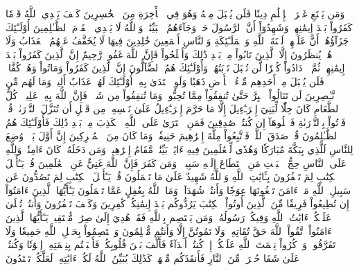 وَمَن يَبۡتَغِ غَيۡرَ ٱلۡإِسۡلَٰمِ دِينٗا فَلَن يُقۡبَلَ مِنۡهُ وَهُوَ فِي ٱلۡأٓخِرَةِ مِنَ ٱلۡخَٰسِرِينَ
كَيۡفَ يَهۡدِي ٱللَّهُ قَوۡمٗا كَفَرُواْ بَعۡدَ إِيمَٰنِهِمۡ وَشَهِدُوٓاْ أَنَّ ٱلرَّسُولَ حَقّٞ وَجَآءَهُمُ ٱلۡبَيِّنَٰتُۚ وَٱللَّهُ لَا يَهۡدِي ٱلۡقَوۡمَ ٱلظَّـٰلِمِينَ
أُوْلَـٰٓئِكَ جَزَآؤُهُمۡ أَنَّ عَلَيۡهِمۡ لَعۡنَةَ ٱللَّهِ وَٱلۡمَلَـٰٓئِكَةِ وَٱلنَّاسِ أَجۡمَعِينَ
خَٰلِدِينَ فِيهَا لَا يُخَفَّفُ عَنۡهُمُ ٱلۡعَذَابُ وَلَا هُمۡ يُنظَرُونَ
إِلَّا ٱلَّذِينَ تَابُواْ مِنۢ بَعۡدِ ذَٰلِكَ وَأَصۡلَحُواْ فَإِنَّ ٱللَّهَ غَفُورٞ رَّحِيمٌ
إِنَّ ٱلَّذِينَ كَفَرُواْ بَعۡدَ إِيمَٰنِهِمۡ ثُمَّ ٱزۡدَادُواْ كُفۡرٗا لَّن تُقۡبَلَ تَوۡبَتُهُمۡ وَأُوْلَـٰٓئِكَ هُمُ ٱلضَّآلُّونَ
إِنَّ ٱلَّذِينَ كَفَرُواْ وَمَاتُواْ وَهُمۡ كُفَّارٞ فَلَن يُقۡبَلَ مِنۡ أَحَدِهِم مِّلۡءُ ٱلۡأَرۡضِ ذَهَبٗا وَلَوِ ٱفۡتَدَىٰ بِهِۦٓۗ أُوْلَـٰٓئِكَ لَهُمۡ عَذَابٌ أَلِيمٞ وَمَا لَهُم مِّن نَّـٰصِرِينَ
لَن تَنَالُواْ ٱلۡبِرَّ حَتَّىٰ تُنفِقُواْ مِمَّا تُحِبُّونَۚ وَمَا تُنفِقُواْ مِن شَيۡءٖ فَإِنَّ ٱللَّهَ بِهِۦ عَلِيمٞ
۞كُلُّ ٱلطَّعَامِ كَانَ حِلّٗا لِّبَنِيٓ إِسۡرَـٰٓءِيلَ إِلَّا مَا حَرَّمَ إِسۡرَـٰٓءِيلُ عَلَىٰ نَفۡسِهِۦ مِن قَبۡلِ أَن تُنَزَّلَ ٱلتَّوۡرَىٰةُۚ قُلۡ فَأۡتُواْ بِٱلتَّوۡرَىٰةِ فَٱتۡلُوهَآ إِن كُنتُمۡ صَٰدِقِينَ
فَمَنِ ٱفۡتَرَىٰ عَلَى ٱللَّهِ ٱلۡكَذِبَ مِنۢ بَعۡدِ ذَٰلِكَ فَأُوْلَـٰٓئِكَ هُمُ ٱلظَّـٰلِمُونَ
قُلۡ صَدَقَ ٱللَّهُۗ فَٱتَّبِعُواْ مِلَّةَ إِبۡرَٰهِيمَ حَنِيفٗاۖ وَمَا كَانَ مِنَ ٱلۡمُشۡرِكِينَ
إِنَّ أَوَّلَ بَيۡتٖ وُضِعَ لِلنَّاسِ لَلَّذِي بِبَكَّةَ مُبَارَكٗا وَهُدٗى لِّلۡعَٰلَمِينَ
فِيهِ ءَايَٰتُۢ بَيِّنَٰتٞ مَّقَامُ إِبۡرَٰهِيمَۖ وَمَن دَخَلَهُۥ كَانَ ءَامِنٗاۗ وَلِلَّهِ عَلَى ٱلنَّاسِ حِجُّ ٱلۡبَيۡتِ مَنِ ٱسۡتَطَاعَ إِلَيۡهِ سَبِيلٗاۚ وَمَن كَفَرَ فَإِنَّ ٱللَّهَ غَنِيٌّ عَنِ ٱلۡعَٰلَمِينَ
قُلۡ يَـٰٓأَهۡلَ ٱلۡكِتَٰبِ لِمَ تَكۡفُرُونَ بِـَٔايَٰتِ ٱللَّهِ وَٱللَّهُ شَهِيدٌ عَلَىٰ مَا تَعۡمَلُونَ
قُلۡ يَـٰٓأَهۡلَ ٱلۡكِتَٰبِ لِمَ تَصُدُّونَ عَن سَبِيلِ ٱللَّهِ مَنۡ ءَامَنَ تَبۡغُونَهَا عِوَجٗا وَأَنتُمۡ شُهَدَآءُۗ وَمَا ٱللَّهُ بِغَٰفِلٍ عَمَّا تَعۡمَلُونَ
يَـٰٓأَيُّهَا ٱلَّذِينَ ءَامَنُوٓاْ إِن تُطِيعُواْ فَرِيقٗا مِّنَ ٱلَّذِينَ أُوتُواْ ٱلۡكِتَٰبَ يَرُدُّوكُم بَعۡدَ إِيمَٰنِكُمۡ كَٰفِرِينَ
وَكَيۡفَ تَكۡفُرُونَ وَأَنتُمۡ تُتۡلَىٰ عَلَيۡكُمۡ ءَايَٰتُ ٱللَّهِ وَفِيكُمۡ رَسُولُهُۥۗ وَمَن يَعۡتَصِم بِٱللَّهِ فَقَدۡ هُدِيَ إِلَىٰ صِرَٰطٖ مُّسۡتَقِيمٖ
يَـٰٓأَيُّهَا ٱلَّذِينَ ءَامَنُواْ ٱتَّقُواْ ٱللَّهَ حَقَّ تُقَاتِهِۦ وَلَا تَمُوتُنَّ إِلَّا وَأَنتُم مُّسۡلِمُونَ
وَٱعۡتَصِمُواْ بِحَبۡلِ ٱللَّهِ جَمِيعٗا وَلَا تَفَرَّقُواْۚ وَٱذۡكُرُواْ نِعۡمَتَ ٱللَّهِ عَلَيۡكُمۡ إِذۡ كُنتُمۡ أَعۡدَآءٗ فَأَلَّفَ بَيۡنَ قُلُوبِكُمۡ فَأَصۡبَحۡتُم بِنِعۡمَتِهِۦٓ إِخۡوَٰنٗا وَكُنتُمۡ عَلَىٰ شَفَا حُفۡرَةٖ مِّنَ ٱلنَّارِ فَأَنقَذَكُم مِّنۡهَاۗ كَذَٰلِكَ يُبَيِّنُ ٱللَّهُ لَكُمۡ ءَايَٰتِهِۦ لَعَلَّكُمۡ تَهۡتَدُونَ
